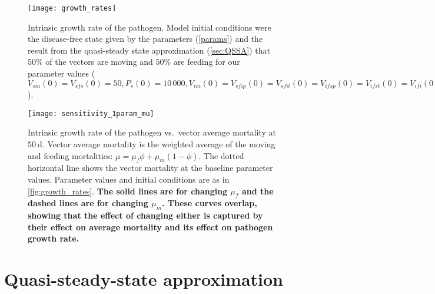 \documentclass{article}
\newcommand{\comment}[1]{\textbf{#1}}
\begin{document}
\begin{figure}
  \centering
  \texttt{[image: growth\_rates]}
  \caption{Intrinsic growth rate of the pathogen.  Model initial
    conditions were the disease-free state given by the parameters
    (\autoref{params}) and the result from the quasi-steady state
    approximation (\autoref{sec:QSSA}) that $50\%$ of the vectors are
    moving and $50\%$ are feeding for our parameter values ($V_{sm}(0)
    = V_{sfs}(0) = 50, P_s(0) = 10\,000, V_{im}(0) = V_{sfip}(0) =
    V_{sfit}(0) = V_{ifsp}(0) = V_{ifst}(0) = V_{ifi}(0) = P_i(0) =
    0$).}
  \label{fig:growth_rates}
\end{figure}

\begin{figure}
  \centering
  \texttt{[image: sensitivity\_1param\_mu]}
  \caption{Intrinsic growth rate of the pathogen vs.~vector average
    mortality at $50~\text{d}$.  Vector average mortality is the
    weighted average of the moving and feeding mortalities: $\mu =
    \mu_f \phi + \mu_m (1 - \phi)$.  The dotted horizontal
    line shows the vector mortality at the baseline parameter values.
    Parameter values and initial conditions are as in
    \autoref{fig:growth_rates}.  \comment{The solid lines are for
      changing $\mu_f$ and the dashed lines are for changing
      $\mu_m$.  These curves overlap, showing that the effect of
      changing either is captured by their effect on average mortality
      and its effect on pathogen growth rate.}}
  \label{fig:sensitivity_1param_mu}
\end{figure}


\section{Quasi-steady-state approximation}
\label{sec:QSSA}
\end{document}
